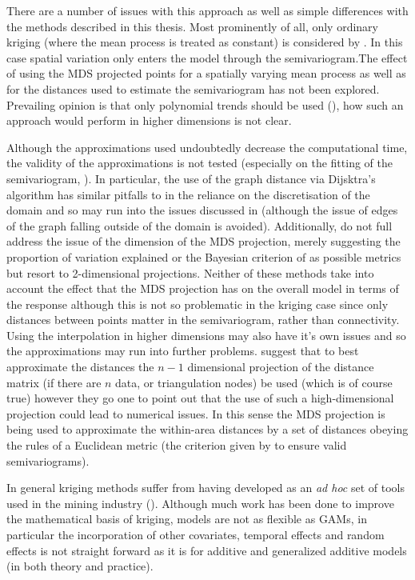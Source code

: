 There are a number of issues with this approach as well as simple differences with the methods described in this thesis. Most prominently of all, only ordinary kriging (where the mean process is treated as constant) is considered by . In this case spatial variation only enters the model through the semivariogram.The effect of using the MDS projected points for a spatially varying mean process as well as for the distances used to estimate the semivariogram has not been explored. Prevailing opinion is that only polynomial trends should be used (\cite[p. 57]{diggle}), how such an approach would perform in higher dimensions is not clear.

Although the approximations used undoubtedly decrease the computational time, the validity of the approximations is not tested (especially on the fitting of the semivariogram, ). In particular, the use of the graph distance via Dijsktra's algorithm has similar pitfalls to  in the reliance on the discretisation of the domain and so may run into the issues discussed in  (although the issue of edges of the graph falling outside of the domain is avoided). Additionally,  do not full address the issue of the dimension of the MDS projection, merely suggesting the proportion of variation explained or the Bayesian criterion of  as possible metrics but resort to 2-dimensional projections. Neither of these methods take into account the effect that the MDS projection has on the overall model in terms of the response although this is not so problematic in the kriging case since only distances between points matter in the semivariogram, rather than connectivity. Using the interpolation in higher dimensions may also have it's own issues and so the approximations may run into further problems.  suggest that to best approximate the distances the $n-1$ dimensional projection of the distance matrix (if there are $n$ data, or triangulation nodes) be used (which is of course true) however they go one to point out that the use of such a high-dimensional projection could lead to numerical issues. In this sense the MDS projection is being used to approximate the within-area distances by a set of distances obeying the rules of a Euclidean metric (the criterion given by  to ensure valid semivariograms). 

In general kriging methods suffer from having developed as an \textit{ad hoc} set of tools used in the mining industry (\cite[preface]{diggle}). Although much work has been done to improve the mathematical basis of kriging, models are not as flexible as GAMs, in particular the incorporation of other covariates, temporal effects and random effects is not straight forward as it is for additive and generalized additive models (in both theory and practice).

